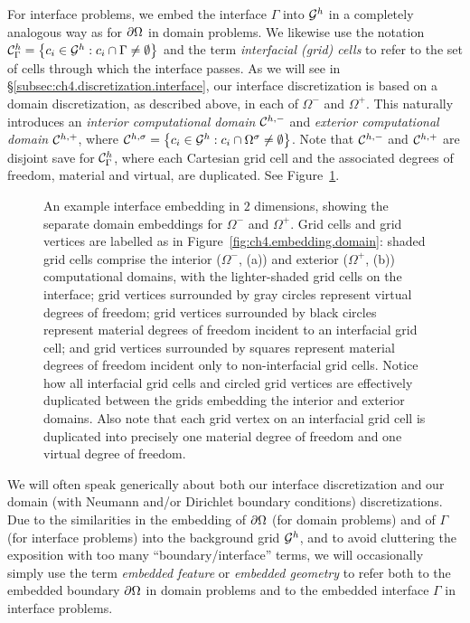 For interface problems, we embed the interface $\Gamma$ into $\mathcal{G}^h$ in a completely analogous way as for $\partial\Omega$ in domain problems. We likewise use the notation $\mathcal{C}_{\Gamma}^h = \left\lbrace  c_i \in \mathcal{G}^h : c_i \cap \Gamma \neq \emptyset  \right\rbrace$ and the term \emph{interfacial (grid) cells} to refer to the set of cells through which the interface passes. As we will see in \S\ref{subsec:ch4.discretization.interface}, our interface discretization is based on a domain discretization, as described above, in each of $\Omega^-$ and $\Omega^+$. This naturally introduces an \emph{interior computational domain} $\mathcal{C}^{h,-}$ and \emph{exterior computational domain} $\mathcal{C}^{h,+}$, where $\mathcal{C}^{h,\sigma} = \left\lbrace  c_i \in \mathcal{G}^h : c_i \cap \Omega^{\sigma} \neq \emptyset  \right\rbrace$. Note that $\mathcal{C}^{h,-}$ and $\mathcal{C}^{h,+}$ are disjoint save for $\mathcal{C}_{\Gamma}^h$, where each Cartesian grid cell and the associated degrees of freedom, material and virtual, are duplicated. See Figure~\ref{fig:ch4.embedding.interface}.

\setlength{\figureheight}{0.50\textwidth}
\begin{figure}[htb]
\centering
{}
\caption{An example interface embedding in $2$ dimensions, showing the separate domain embeddings for $\Omega^-$ and $\Omega^+$. Grid cells and grid vertices are labelled as in Figure~\ref{fig:ch4.embedding.domain}: shaded grid cells comprise the interior ($\Omega^-$, (a)) and exterior ($\Omega^+$, (b)) computational domains, with the lighter-shaded grid cells on the interface; grid vertices surrounded by gray circles represent virtual degrees of freedom; grid vertices surrounded by black circles represent material degrees of freedom incident to an interfacial grid cell; and grid vertices surrounded by squares represent material degrees of freedom incident only to non-interfacial grid cells. Notice how all interfacial grid cells and circled grid vertices are effectively duplicated between the grids embedding the interior and exterior domains. Also note that each grid vertex on an interfacial grid cell is duplicated into precisely one material degree of freedom and one virtual degree of freedom.}
\label{fig:ch4.embedding.interface}
\end{figure}

We will often speak generically about both our interface discretization and our domain (with Neumann and/or Dirichlet boundary conditions) discretizations. Due to the similarities in the embedding of $\partial\Omega$ (for domain problems) and of $\Gamma$ (for interface problems) into the background grid $\mathcal{G}^h$, and to avoid cluttering the exposition with too many ``boundary/interface'' terms, we will occasionally simply use the term \emph{embedded feature} or \emph{embedded geometry} to refer both to the embedded boundary $\partial\Omega$ in domain problems and to the embedded interface $\Gamma$ in interface problems.

